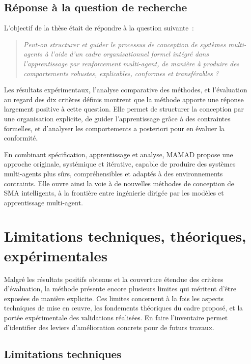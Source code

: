 \subsection*{Réponse à la question de recherche}

\noindent
L’objectif de la thèse était de répondre à la question suivante~:

\begin{quote}
    \emph{Peut-on structurer et guider le processus de conception de systèmes multi-agents à l’aide d’un cadre organisationnel formel intégré dans l’apprentissage par renforcement multi-agent, de manière à produire des comportements robustes, explicables, conformes et transférables ?}
\end{quote}

\noindent
Les résultats expérimentaux, l’analyse comparative des méthodes, et l’évaluation au regard des dix critères définis montrent que la méthode  apporte une réponse largement positive à cette question. Elle permet de structurer la conception par une organisation explicite, de guider l’apprentissage grâce à des contraintes formelles, et d’analyser les comportements a posteriori pour en évaluer la conformité.

En combinant spécification, apprentissage et analyse, MAMAD propose une approche originale, systémique et itérative, capable de produire des systèmes multi-agents plus sûrs, compréhensibles et adaptés à des environnements contraints. Elle ouvre ainsi la voie à de nouvelles méthodes de conception de SMA intelligents, à la frontière entre ingénierie dirigée par les modèles et apprentissage multi-agent.

\section{Limitations techniques, théoriques, expérimentales}
\label{sec:limitations}

\noindent
Malgré les résultats positifs obtenus et la couverture étendue des critères d’évaluation, la méthode  présente encore plusieurs limites qui méritent d’être exposées de manière explicite. Ces limites concernent à la fois les aspects techniques de mise en œuvre, les fondements théoriques du cadre proposé, et la portée expérimentale des validations réalisées. En faire l’inventaire permet d’identifier des leviers d’amélioration concrets pour de futurs travaux.

\subsection*{Limitations techniques}


